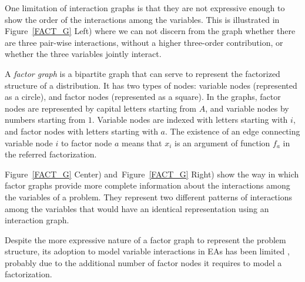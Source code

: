 \documentclass{article} %
\begin{document}
 One limitation of interaction graphs is that they are not expressive enough to show the order of the interactions among the variables. This is illustrated in Figure~\ref{FACT_G} Left) where we can not discern from the graph whether there are three pair-wise interactions, without a higher three-order contribution, or whether the three variables jointly interact. 

 A \emph{factor graph} \cite{Kschischang_et_al:2001} is a bipartite graph that can serve to represent the factorized structure of a distribution. It has two types of nodes: variable nodes (represented as a circle), and factor nodes (represented  as a square). In the graphs, factor nodes are represented by capital letters starting from $A$, and variable nodes by numbers starting from $1$. Variable nodes are indexed with letters starting with $i$, and factor nodes with letters starting with $a$. The existence of an edge connecting variable node $i$ to factor node $a$ means that $x_i$ is an argument of function $f_a$ in the referred factorization.

 Figure~\ref{FACT_G} Center) and~Figure~\ref{FACT_G} Right) show the way in which factor graphs provide more complete information about the interactions among the variables of a problem. They represent two different patterns of interactions among the variables that would have an identical representation using an interaction graph. 

 Despite the more expressive nature of a factor graph to represent the problem structure, its adoption to model variable interactions in EAs has been limited \cite{Helmi_et_al:2014,Lima_et_al:2009,Mendiburu_et_al:2007a,Muhlenbein:2012}, probably due to the additional number of factor nodes it requires to model a factorization.
 
\end{document}
